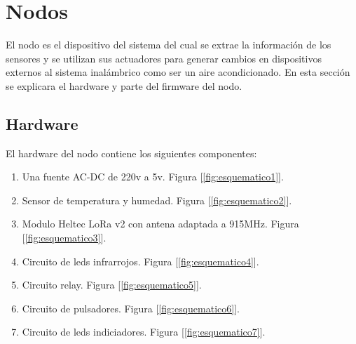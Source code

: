 %
%
%
%
%
%
%
%
%	
%		
%
%		
%		
%		
%		

\section{Nodos}
\label{sec:nodos}

El nodo es el dispositivo del sistema del cual se extrae la información de los sensores y se utilizan sus actuadores para generar cambios en dispositivos externos al sistema inalámbrico como ser un aire acondicionado. En esta sección se explicara el hardware y parte del firmware del nodo.

\subsection{Hardware}

El hardware del nodo contiene los siguientes componentes:

\begin{enumerate}
\item Una fuente AC-DC de 220v a 5v. Figura [\ref{fig:esquematico1}].
\item Sensor de temperatura y humedad. Figura [\ref{fig:esquematico2}].
\item Modulo Heltec LoRa v2 con antena adaptada a 915MHz. Figura [\ref{fig:esquematico3}].
\item Circuito de leds infrarrojos. Figura [\ref{fig:esquematico4}].
\item Circuito relay. Figura [\ref{fig:esquematico5}].
\item Circuito de pulsadores. Figura [\ref{fig:esquematico6}].
\item Circuito de leds indiciadores. Figura [\ref{fig:esquematico7}].
\end{enumerate}

